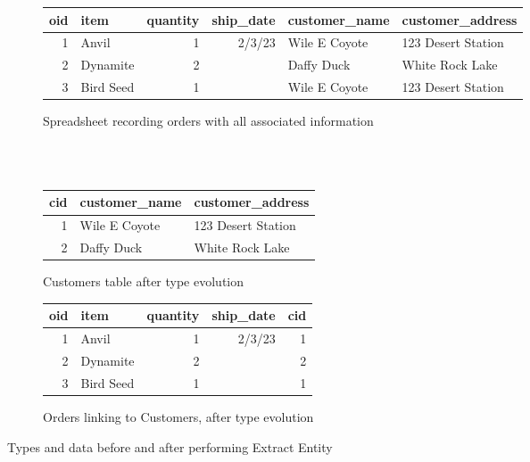 \documentclass[english,submission]{programming}
\begin{document}
\begin{figure}
\begin{adjustwidth}{-2em}{-3em}
\begin{subfigure}[b]{35em}\vspace{0pt}
  \sffamily
  \small
  \begin{tabular}{ |r|l|r|r|l|l|}
     \hline
     oid & item & quantity & ship\_date & customer\_name & customer\_address \\
     \hline \hline
     1 & Anvil & 1 & 2/3/23 & Wile E Coyote & 123 Desert Station \\
     \hline
     2 & Dynamite & 2 & & Daffy Duck & White Rock Lake \\
     \hline
     3 & Bird Seed & 1 & & Wile E Coyote & 123 Desert Station \\
     \hline
  \end{tabular}
  \caption{Spreadsheet recording orders with all associated information}
  \label{fig:db-orders}
\end{subfigure}
\hfill
\\[-0.5em]~\\
\begin{subfigure}[b]{20em}\vspace{0pt}
  \sffamily
  \small
  \begin{tabular}{ |r|l|l|}
    \hline
    cid & customer\_name & customer\_address \\
    \hline \hline
    1 & Wile E Coyote & 123 Desert Station \\
    \hline
    2 & Daffy Duck & White Rock Lake \\
    \hline
  \end{tabular}
  \caption{Customers table after type evolution}
  \label{fig:db-customers}
\end{subfigure}
\hfill
\begin{subfigure}[b]{20em}\vspace{0pt}
  \sffamily
  \small
  \begin{tabular}{ |r|l|r|r|r|}
     \hline
     oid & item & quantity & ship\_date & cid \\
     \hline \hline
     1 & Anvil & 1 & 2/3/23 & 1 \\
     \hline
     2 & Dynamite & 2 & & 2  \\
     \hline
     3 & Bird Seed & 1 & & 1 \\
     \hline
    \end{tabular}
  \caption{Orders linking to Customers, after type evolution}
 \label{fig:db-orders-link}
\end{subfigure}
\end{adjustwidth}
\vspace{0.25em}
\caption{Types and data before and after performing Extract Entity}
\label{fig:db}
\end{figure}
\end{document}
